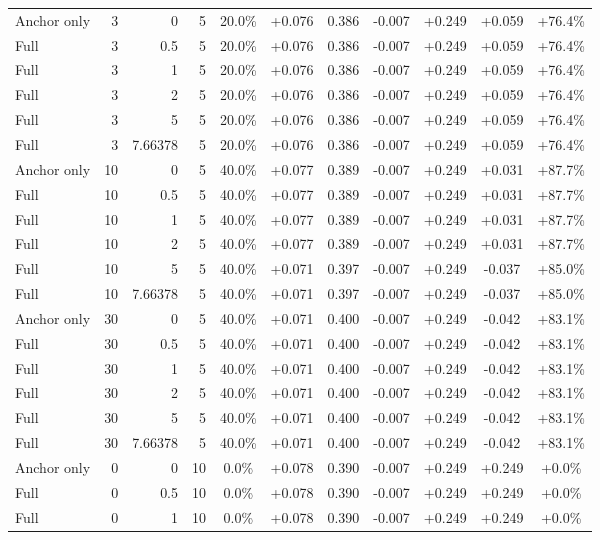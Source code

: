 \begin{table}[htbp]
\begin{tabular}{lrrrccccccc}
Anchor only & 3 & 0 & 5 & 20.0\% & +0.076 & 0.386 & -0.007 & +0.249 & +0.059 & +76.4\% \\
Full & 3 & 0.5 & 5 & 20.0\% & +0.076 & 0.386 & -0.007 & +0.249 & +0.059 & +76.4\% \\
Full & 3 & 1 & 5 & 20.0\% & +0.076 & 0.386 & -0.007 & +0.249 & +0.059 & +76.4\% \\
Full & 3 & 2 & 5 & 20.0\% & +0.076 & 0.386 & -0.007 & +0.249 & +0.059 & +76.4\% \\
Full & 3 & 5 & 5 & 20.0\% & +0.076 & 0.386 & -0.007 & +0.249 & +0.059 & +76.4\% \\
Full & 3 & 7.66378 & 5 & 20.0\% & +0.076 & 0.386 & -0.007 & +0.249 & +0.059 & +76.4\% \\
Anchor only & 10 & 0 & 5 & 40.0\% & +0.077 & 0.389 & -0.007 & +0.249 & +0.031 & +87.7\% \\
Full & 10 & 0.5 & 5 & 40.0\% & +0.077 & 0.389 & -0.007 & +0.249 & +0.031 & +87.7\% \\
Full & 10 & 1 & 5 & 40.0\% & +0.077 & 0.389 & -0.007 & +0.249 & +0.031 & +87.7\% \\
Full & 10 & 2 & 5 & 40.0\% & +0.077 & 0.389 & -0.007 & +0.249 & +0.031 & +87.7\% \\
Full & 10 & 5 & 5 & 40.0\% & +0.071 & 0.397 & -0.007 & +0.249 & -0.037 & +85.0\% \\
Full & 10 & 7.66378 & 5 & 40.0\% & +0.071 & 0.397 & -0.007 & +0.249 & -0.037 & +85.0\% \\
Anchor only & 30 & 0 & 5 & 40.0\% & +0.071 & 0.400 & -0.007 & +0.249 & -0.042 & +83.1\% \\
Full & 30 & 0.5 & 5 & 40.0\% & +0.071 & 0.400 & -0.007 & +0.249 & -0.042 & +83.1\% \\
Full & 30 & 1 & 5 & 40.0\% & +0.071 & 0.400 & -0.007 & +0.249 & -0.042 & +83.1\% \\
Full & 30 & 2 & 5 & 40.0\% & +0.071 & 0.400 & -0.007 & +0.249 & -0.042 & +83.1\% \\
Full & 30 & 5 & 5 & 40.0\% & +0.071 & 0.400 & -0.007 & +0.249 & -0.042 & +83.1\% \\
Full & 30 & 7.66378 & 5 & 40.0\% & +0.071 & 0.400 & -0.007 & +0.249 & -0.042 & +83.1\% \\
Anchor only & 0 & 0 & 10 & 0.0\% & +0.078 & 0.390 & -0.007 & +0.249 & +0.249 & +0.0\% \\
Full & 0 & 0.5 & 10 & 0.0\% & +0.078 & 0.390 & -0.007 & +0.249 & +0.249 & +0.0\% \\
Full & 0 & 1 & 10 & 0.0\% & +0.078 & 0.390 & -0.007 & +0.249 & +0.249 & +0.0\% \\

\end{tabular}
\end{table}

